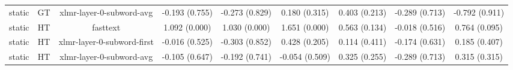 \begin{sidewaystable}[htb]
\begin{tabular}{@{}ccccccccc@{}}
        static & GT & xlmr-layer-0-subword-avg & -0.193 (0.755) & -0.273 (0.829) & 0.180 (0.315) & 0.403 (0.213) & -0.289 (0.713) & -0.792 (0.911) \\
        static & HT & fasttext & 1.092 (0.000) & 1.030 (0.000) & 1.651 (0.000) & 0.563 (0.134) & -0.018 (0.516) & 0.764 (0.095) \\
        static & HT & xlmr-layer-0-subword-first & -0.016 (0.525) & -0.303 (0.852) & 0.428 (0.205) & 0.114 (0.411) & -0.174 (0.631) & 0.185 (0.407) \\
        static & HT & xlmr-layer-0-subword-avg & -0.105 (0.647) & -0.192 (0.741) & -0.054 (0.509) & 0.325 (0.255) & -0.289 (0.713) & 0.315 (0.315) \\
        \bottomrule
    \end{tabular}
\end{sidewaystable}